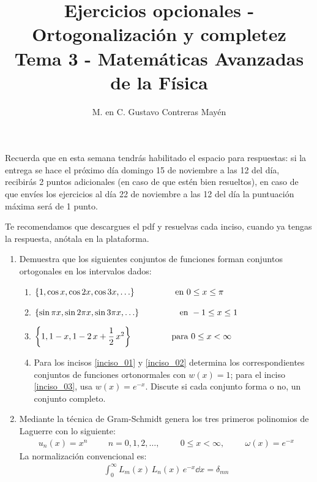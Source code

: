 
\usepackage{apacite}
\title{Ejercicios opcionales - Ortogonalización y completez\\[0.3em]  \large{Tema 3 - Matemáticas Avanzadas de la Física}\vspace{-3ex}}
\author{M. en C. Gustavo Contreras Mayén}
\date{ }

\vspace{-4cm}
\maketitle
\fontsize{14}{14}\selectfont
Recuerda que en esta semana tendrás habilitado el espacio para respuestas: si la entrega se hace el próximo día domingo 15 de noviembre a las 12 del día, recibirás 2 puntos adicionales (en caso de que estén bien resueltos), en caso de que envíes los ejercicios al día 22 de noviembre a las 12 del día la puntuación máxima será de 1 punto.
\par
Te recomendamos que descargues el pdf y resuelvas cada inciso, cuando ya tengas la respuesta, anótala en la plataforma.

\begin{enumerate}
\item Demuestra que los siguientes conjuntos de funciones forman conjuntos ortogonales en los intervalos dados:
\begin{enumerate}
\item $\left\{ 1, \cos x, \cos 2 x, \cos 3 x, \ldots\right\}  \hspace{1.5cm} \mbox{ en } 0 \leq x \leq \pi$\label{inciso_01}
\item $\left\{ \sin \pi x, \sin 2 \pi x, \sin 3 \pi x, \ldots \right\} \hspace{1.5cm} \mbox{ en } -1 \leq x \leq 1$\label{inciso_02}
\item $\left\{ 1, 1 - x, 1 - 2 \, x + \dfrac{1}{2} \, x^{2} \right\} \hspace{1.5cm} \mbox{ para } 0 \leq x < \infty$\label{inciso_03}
\item Para los incisos \ref{inciso_01} y \ref{inciso_02} determina los correspondientes conjuntos de funciones ortonormales con $w(x) = 1$; para el inciso \ref{inciso_03}, usa $w(x) = e^{-x}$. Discute si cada conjunto forma o no, un conjunto completo.
\end{enumerate}
\item Mediante la técnica de Gram-Schmidt genera los tres primeros polinomios de Laguerre con lo siguiente:
\begin{align*}
u_{n}(x) = x^{n} \hspace{1cm} n = 0, 1, 2, \ldots, \hspace{1cm} 0 \leq x < \infty, \hspace{1cm} \omega(x) = e^{-x}
\end{align*}
La normalización convencional es:
\begin{align*}
\int_{0}^{\infty} L_{m}(x) \, L_{n}(x) \, e^{-x} \dd{x} = \delta_{mn}
\end{align*}
\end{enumerate}

